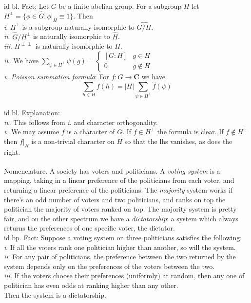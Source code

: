 \documentclass[oneside]{book}
\newcommand{\C}{\mathbf{C}}
\newcommand{\set}[1]{\{ #1\}}
\newcommand{\abs}[1]{\left\lvert #1\right\rvert}
\renewcommand{\i}{{\it i}. }
\newcommand{\ii}{{\it ii}. }
\newcommand{\iii}{{\it iii}. }
\newcommand{\iv}{{\it iv}. }
\renewcommand{\v}{{\it v}. }
\newcommand{\nin}{\not\in}
\begin{document}
id bl. Fact: Let $G$ be a finite abelian group. For a subgroup $H$ let $H^\perp=\set{\phi\in\widehat{G}:\phi\rvert_H\equiv 1}$. Then\\
\i  $H^\perp$ is a subgroup naturally isomorphic to $\widehat{G/H}$. \\
\ii $\widehat{G}/H^\perp$ is naturally isomorphic to $\widehat{H}$. \\
\iii $H^{\perp\perp}$ is naturally isomorphic to $H$.   \\
\iv We have $\displaystyle\sum_{\psi\in H^\perp}\psi(g) =\begin{cases}
			[G:H] & g\in H\\
            0 & g\not\in H
		 \end{cases}$ \\
\v {\it Poisson summation formula}: For $f:G\to\C$ we have $$\sum_{h\in H}f(h) = \abs{H} \sum_{\psi\in H^\perp}\hat{f}(\psi)$$
\\


id bl. Explanation: \\
\iv This follows from \i and character orthogonality.   \\
\v We may assume $f$ is a character of $G$. If $f\in H^\perp$ the formula is clear. If $f\nin H^\perp$ then $f\rvert_H$ is a non-trivial character on $H$ so that the lhs vanishes, as does the right.  \\\\


Nomenclature. A society has voters and politicians. A {\it voting system} is a mapping, taking in a linear preference of the politicians from each voter, and returning a linear preference of the politicians. The {\it majority} system works if there's an odd number of voters and two politicians, and ranks on top the politician the majority of voters ranked on top. The majority system is pretty fair, and on the other spectrum we have a {\it dictatorship}: a system which always returns the preferences of one specific voter, the dictator.    \\


id bp. Fact: Suppose a voting system on three politicians satisfies the following:  \\
\i If all the voters rank one politician higher than another, so will the system.  \\
\ii For any pair of politicians, the preference between the two returned by the system depends only on the preferences of the voters between the two.  \\
\iii If the voters choose their preferences (uniformly) at random, then any one of politician has even odds at ranking higher than any other.  \\
Then the system is a dictatorship.  \\\\
\end{document}
